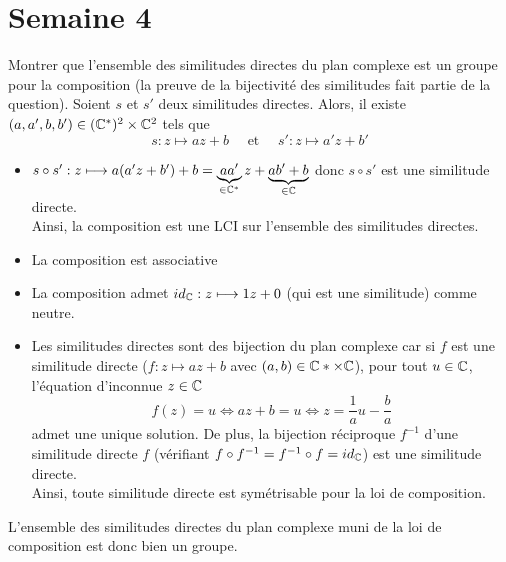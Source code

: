 \documentclass{article}
\renewenvironment{question_kholle}[2][ ]
{
	\subsection{\texorpdfstring{#2}{}}
	\notblank{#1}
	{
		\noindent #1
		\bigbreak
	}
	{}
	\begin{proof}
}
{
	\end{proof}
}
\begin{document}
\pagebreak\section{Semaine 4}
\begin{question_kholle}{Montrer que l'ensemble des similitudes directes du plan complexe est un groupe pour la composition (la preuve de la bijectivité des similitudes fait partie de la question).}
  Soient $s$ et $s'$ deux similitudes directes. Alors, il existe $(a,a',b,b')\in(\mathbb C^*)^2\times \mathbb C^2$ tels que
  \[
    s:z\longmapsto az+b \quad\text{ et }\quad s':z\longmapsto a'z+b'
  \]
  \begin{itemize}[label=$\star$]
    \item $s\circ s': z\longmapsto a(a'z+b')+b = \underbrace{aa'}_{\in\mathbb C^*}z+\underbrace{ab'+b}_{\in\mathbb C}$ donc $s\circ s'$ est une similitude directe.\\
          Ainsi, la composition est une LCI sur l'ensemble des similitudes directes.
    \item La composition est associative
    \item La composition admet $id_{\mathbb C}:z\longmapsto 1z+0$ (qui est une similitude) comme neutre.
    \item Les similitudes directes sont des bijection du plan complexe car si $f$ est une similitude directe ($f:z\longmapsto az+b$ avec $(a,b)\in\mathbb C*\times\mathbb C$), pour tout $u\in\mathbb C$, l'équation d'inconnue $z\in\mathbb C$
          \[
            f(z)=u \iff az+b=u \iff z=\frac{1}{a}u-\frac{b}{a}
          \]
          admet une unique solution. De plus, la bijection réciproque $f^{-1}$ d'une similitude directe $f$ (vérifiant $f\circ f^{-1} = f^{-1}\circ f = id_{\mathbb C}$) est une similitude directe.\\
          Ainsi, toute similitude directe est symétrisable pour la loi de composition.
  \end{itemize}
  L'ensemble des similitudes directes du plan complexe muni de la loi de composition est donc bien un groupe.
\end{question_kholle}
\end{document}
